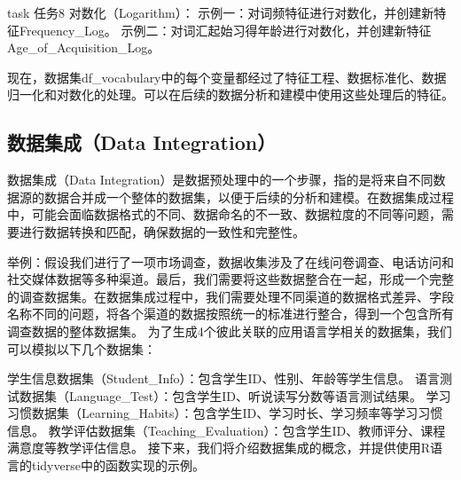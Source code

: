 \documentclass[]{book}
\newenvironment{Shaded}{\begin{snugshade}}{\end{snugshade}}
\newcommand{\CommentTok}[1]{\textcolor[rgb]{0.56,0.35,0.01}{\textit{#1}}}
\newcommand{\DataTypeTok}[1]{\textcolor[rgb]{0.13,0.29,0.53}{#1}}
\newcommand{\KeywordTok}[1]{\textcolor[rgb]{0.13,0.29,0.53}{\textbf{#1}}}
\newcommand{\NormalTok}[1]{#1}
\newcommand{\OperatorTok}[1]{\textcolor[rgb]{0.81,0.36,0.00}{\textbf{#1}}}
\newcommand{\StringTok}[1]{\textcolor[rgb]{0.31,0.60,0.02}{#1}}
\begin{document}
\begin{infobox}task
任务8
对数化（Logarithm）：
示例一：对词频特征进行对数化，并创建新特征Frequency\_Log。
示例二：对词汇起始习得年龄进行对数化，并创建新特征Age\_of\_Acquisition\_Log。

\end{infobox}

\begin{Shaded}
\end{Shaded}

现在，数据集df\_vocabulary中的每个变量都经过了特征工程、数据标准化、数据归一化和对数化的处理。可以在后续的数据分析和建模中使用这些处理后的特征。

\hypertarget{ux6570ux636eux96c6ux6210data-integration}{%
\subsection{数据集成（Data Integration）}\label{ux6570ux636eux96c6ux6210data-integration}}

数据集成（Data Integration）是数据预处理中的一个步骤，指的是将来自不同数据源的数据合并成一个整体的数据集，以便于后续的分析和建模。在数据集成过程中，可能会面临数据格式的不同、数据命名的不一致、数据粒度的不同等问题，需要进行数据转换和匹配，确保数据的一致性和完整性。

举例：假设我们进行了一项市场调查，数据收集涉及了在线问卷调查、电话访问和社交媒体数据等多种渠道。最后，我们需要将这些数据整合在一起，形成一个完整的调查数据集。在数据集成过程中，我们需要处理不同渠道的数据格式差异、字段名称不同的问题，将各个渠道的数据按照统一的标准进行整合，得到一个包含所有调查数据的整体数据集。
为了生成4个彼此关联的应用语言学相关的数据集，我们可以模拟以下几个数据集：

学生信息数据集（Student\_Info）：包含学生ID、性别、年龄等学生信息。
语言测试数据集（Language\_Test）：包含学生ID、听说读写分数等语言测试结果。
学习习惯数据集（Learning\_Habits）：包含学生ID、学习时长、学习频率等学习习惯信息。
教学评估数据集（Teaching\_Evaluation）：包含学生ID、教师评分、课程满意度等教学评估信息。
接下来，我们将介绍数据集成的概念，并提供使用R语言的tidyverse中的函数实现的示例。
\end{document}
